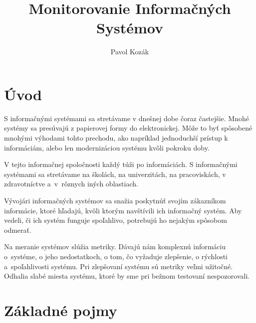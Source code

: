 \documentclass[a4paper, upjsfrontpage, thesismargins, thesislinespacing]{rnthesis}
\title{Monitorovanie Informačných Systémov}
\author{Pavol Kozák}
\begin{document}
\maketitle
\newpage

\setcounter{tocdepth}{2}
\tableofcontents

\newpage


\chapter*{Úvod}

S informačnými systémami sa stretávame v dnešnej dobe čoraz častejšie. 
Mnohé systémy sa presúvajú z papierovej formy do elektronickej.
Môže to byť spôsobené mnohými výhodami tohto prechodu, ako napríklad jednoduchší prístup k informáciám, alebo len modernizáciou systému kvôli pokroku doby.

V tejto informačnej spoločnosti každý túži po informáciách.
S informačnými systémami sa stretávame na školách, na univerzitách, na pracoviskách, v zdravot\-níc\-tve a~v~rôznych iných oblastiach.

Vývojári informačných systémov sa snažia poskytnúť svojím zákazníkom informácie, ktoré hľadajú, kvôli ktorým navštívili ich informačný systém.
Aby vedeli, či ich systém funguje spoľahlivo, potrebujú ho nejakým spôsobom odmerať.

Na meranie systémov slúžia metriky.
Dávajú nám komplexnú informáciu o~systéme, o jeho nedostatkoch, o tom, čo vyžaduje zlepšenie, o rýchlosti a~spoľahli\-vos\-ti systému.
Pri zlepšovaní systému sú metriky veľmi užitočné.
Odhalia slabé miesta systému, ktoré by sme pri bežnom testovaní nespozorovali.

\chapter{Základné pojmy}

\end{document}

